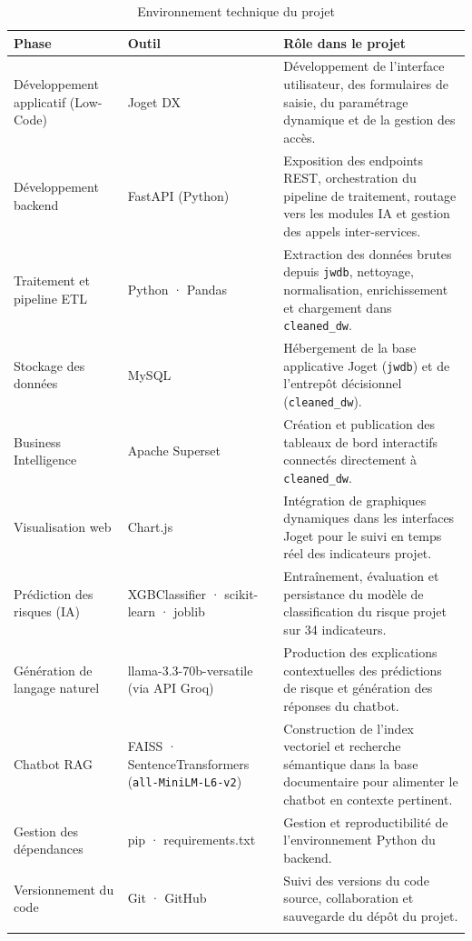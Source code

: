 \begin{longtable}{|m{4cm}|m{4.5cm}|m{6cm}|}
\hline
\textbf{Phase} & \textbf{Outil} & \textbf{Rôle dans le projet} \\
\hline
\endhead

Développement applicatif (Low-Code)
& Joget DX
& Développement de l'interface utilisateur, des formulaires de saisie,
  du paramétrage dynamique et de la gestion des accès. \\
\hline

Développement backend
& FastAPI (Python)
& Exposition des endpoints REST, orchestration du pipeline de
  traitement, routage vers les modules IA et gestion des appels
  inter-services. \\
\hline

Traitement et pipeline ETL
& Python · Pandas
& Extraction des données brutes depuis \texttt{jwdb}, nettoyage,
  normalisation, enrichissement et chargement dans
  \texttt{cleaned\_dw}. \\
\hline

Stockage des données
& MySQL
& Hébergement de la base applicative Joget (\texttt{jwdb}) et de
  l'entrepôt décisionnel (\texttt{cleaned\_dw}). \\
\hline

Business Intelligence
& Apache Superset
& Création et publication des tableaux de bord interactifs connectés
  directement à \texttt{cleaned\_dw}. \\
\hline

Visualisation web
& Chart.js
& Intégration de graphiques dynamiques dans les interfaces Joget
  pour le suivi en temps réel des indicateurs projet. \\
\hline

Prédiction des risques (IA)
& XGBClassifier · scikit-learn · joblib
& Entraînement, évaluation et persistance du modèle de classification
  du risque projet sur 34 indicateurs. \\
\hline

Génération de langage naturel
& llama-3.3-70b-versatile (via API Groq)
& Production des explications contextuelles des prédictions de risque
  et génération des réponses du chatbot. \\
\hline

Chatbot RAG
& FAISS · SentenceTransformers (\texttt{all-MiniLM-L6-v2})
& Construction de l'index vectoriel et recherche sémantique dans la
  base documentaire pour alimenter le chatbot en contexte pertinent. \\
\hline

Gestion des dépendances
& pip · requirements.txt
& Gestion et reproductibilité de l'environnement Python du backend. \\
\hline

Versionnement du code
& Git · GitHub
& Suivi des versions du code source, collaboration et sauvegarde du
  dépôt du projet. \\
\hline

\captionsetup{justification=centering,margin=2cm}
\caption{Environnement technique du projet}
\label{tab:env_technique}
\end{longtable}

